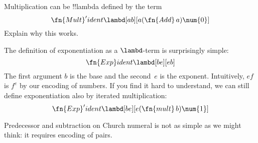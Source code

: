 \documentclass[../../../include/open-logic-section]{subfiles}
\begin{document}
\begin{prob}
Multiplication can be !!{lambda define}d by the term
\[
  \fn{Mult}' ident \lambd[ab][a (\fn{Add}\, a) \num{0}]
\]
Explain why this works.
\end{prob}

The definition of exponentiation as a $\lambd$-term is
surprisingly simple:
\[
  \fn{Exp} ident \lambd[be][e b]
\]
The first argument $b$ is the base and the second~$e$ is the exponent.
Intuitively, $e f$ is $f^e$ by our encoding of numbers. If you find it
hard to understand, we can still define exponentiation also by
iterated multiplication:
\[
  \fn{Exp}' ident \lambd[be][e (\fn{mult}\, b) \num{1}]
\]

Predecessor and subtraction on Church numeral is not as simple as we
might think: it requires encoding of pairs.
\end{document}
